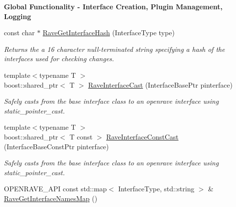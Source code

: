 \begin{Indent}{\bf Global Functionality -\/ Interface Creation, Plugin Management, Logging}\par
{\em \label{_amgrpa44636317fec477debce11f23bc74d59}
 \label{namespaceOpenRAVE_global_functionality}
\hypertarget{namespaceOpenRAVE_global_functionality}{}
 }\begin{DoxyCompactItemize}
\item 
\hypertarget{namespaceOpenRAVE_a58037fbef85e1f0c8695edd7e2537172}{
const char $\ast$ \hyperlink{namespaceOpenRAVE_a58037fbef85e1f0c8695edd7e2537172}{RaveGetInterfaceHash} (InterfaceType type)}
\label{namespaceOpenRAVE_a58037fbef85e1f0c8695edd7e2537172}

\begin{DoxyCompactList}\small\item\em Returns the a 16 character null-\/terminated string specifying a hash of the interfaces used for checking changes. \item\end{DoxyCompactList}\item 
{\footnotesize template$<$typename T $>$ }\\boost::shared\_\-ptr$<$ T $>$ \hyperlink{namespaceOpenRAVE_a5f46fb9ff755f614ea5636851a89952c}{RaveInterfaceCast} (InterfaceBasePtr pinterface)
\begin{DoxyCompactList}\small\item\em Safely casts from the base interface class to an openrave interface using static\_\-pointer\_\-cast. \item\end{DoxyCompactList}\item 
{\footnotesize template$<$typename T $>$ }\\boost::shared\_\-ptr$<$ T const  $>$ \hyperlink{namespaceOpenRAVE_adf731ae412bd36fe76b35c4e2e4f6478}{RaveInterfaceConstCast} (InterfaceBaseConstPtr pinterface)
\begin{DoxyCompactList}\small\item\em Safely casts from the base interface class to an openrave interface using static\_\-pointer\_\-cast. \item\end{DoxyCompactList}\item 
\hypertarget{namespaceOpenRAVE_a40aaaac68155bc8447cdb0d90e7c88d2}{
OPENRAVE\_\-API const std::map$<$ InterfaceType, std::string $>$ \& \hyperlink{namespaceOpenRAVE_a40aaaac68155bc8447cdb0d90e7c88d2}{RaveGetInterfaceNamesMap} ()}
\label{namespaceOpenRAVE_a40aaaac68155bc8447cdb0d90e7c88d2}


\end{DoxyCompactItemize}
\end{Indent}
